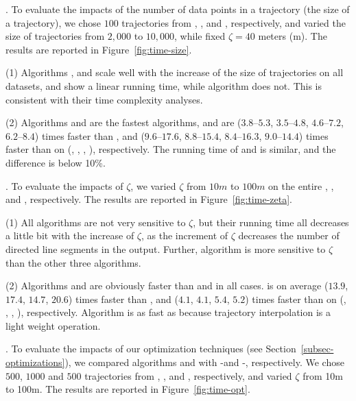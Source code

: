 .
To evaluate the impacts of the number of data points in a trajectory (\ie the size of a trajectory),
we chose $100$ trajectories from \taxi, \truck, \sercar and \geolife, respectively,
and varied the size  of trajectories from $2,000$ to $10,000$, while fixed $\zeta = 40$ meters (m).
The results are reported in Figure~\ref{fig:time-size}.

\sstab(1) Algorithms \operb, \operba and \fbqsa  scale well with the increase of the size of trajectories on all datasets,
and show a linear running time, while algorithm \dpa does not.
This is consistent with their time complexity analyses.

\sstab(2) Algorithms \operb and \operba are the fastest \lsa algorithms, and are {($3.8$--$5.3$, $3.5$--$4.8$, $4.6$--$7.2$, $6.2$--$8.4$)} times faster than \fbqsa,
and {($9.6$--$17.6$, $8.8$--$15.4$, $8.4$--$16.3$, $9.0$--$14.4$)} times faster than \dpa on (\taxi, \truck, \sercar, \geolife), respectively. The running time of \operb and \operba is similar, and the difference is below 10\%.

.
To evaluate the impacts of $\zeta$, we varied $\zeta$ from $10m$ to $100m$ on the entire \taxi, \truck, \sercar and \geolife, respectively.
The results are reported in Figure~\ref{fig:time-zeta}.


\sstab(1) All algorithms are not very sensitive to $\zeta$, but their running time all decreases a little bit with the increase of $\zeta$,
as the increment of $\zeta$ decreases the number of directed line segments in the output.
Further, algorithm \dpa is more sensitive to $\zeta$ than the other three algorithms.

\sstab(2) Algorithms \operb and \operba are obviously faster than \dpa and \fbqsa in all cases.
\operb is on average ($13.9$, $17.4$, $14.7$, {$20.6$}) times faster than \dpa, and ($4.1$, $4.1$, $5.4$, {$5.2$}) times faster than \fbqsa on (\taxi, \truck, \sercar, {\geolife}), respectively. Algorithm \operba is as fast as \operb because trajectory interpolation is a light weight operation.

.
To evaluate the impacts of our optimization techniques (see Section~\ref{subsec-optimizations}),
we compared algorithms \operb and \operba with -\operb and -\operba, respectively.
We chose $500$, $1000$ and $500$ trajectories from \taxi, \truck, \sercar and \geolife, respectively, and varied $\zeta$ from 10m to 100m.
The results are reported in Figure~\ref{fig:time-opt}.

